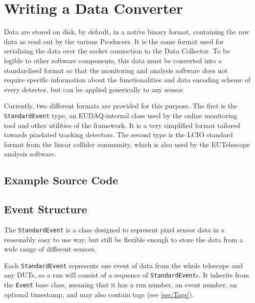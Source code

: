 \section{Writing a Data Converter}
Data are stored on disk, by default, in a native binary format, containing the raw data as read out by the various Producers.
It is the same format used for serialising the data over the socket connection to the Data Collector.
To be legible to other software components, this data must be converted into a standardised format so that the monitoring and analysis software
does not require specific information about the functionalities and data encoding scheme of every detector, but can be applied generically to any sensor.

Currently, two different formats are provided for this purpose.
The first is the \texttt{StandardEvent} type, an EUDAQ-internal class used by the online monitoring tool and other utilities of the framework. It is a very simplified format tailored towards pixelated tracking detectors.
The second type is the \gls{LCIO} standard format from the linear collider community,
which is also used by the EUTelescope analysis software.

\subsection{Example Source Code}\label{sec:Ex0RawEvent2StdEventConverter_cc}
\newpage

\subsection{Event Structure}
The \texttt{StandardEvent} is a class designed to represent pixel sensor data in a reasonably easy to use way,
but still be flexible enough to store the data from a wide range of different sensors.

Each \texttt{StandardEvent} represents one event of data from the whole telescope and any \glspl{DUT},
so a run will consist of a sequence of \texttt{StandardEvent}s.
It inherits from the \texttt{Event} base class, meaning that it has a run number, an event number, an optional timestamp,
and may also contain tags (see \autoref{sec:Tags}).

